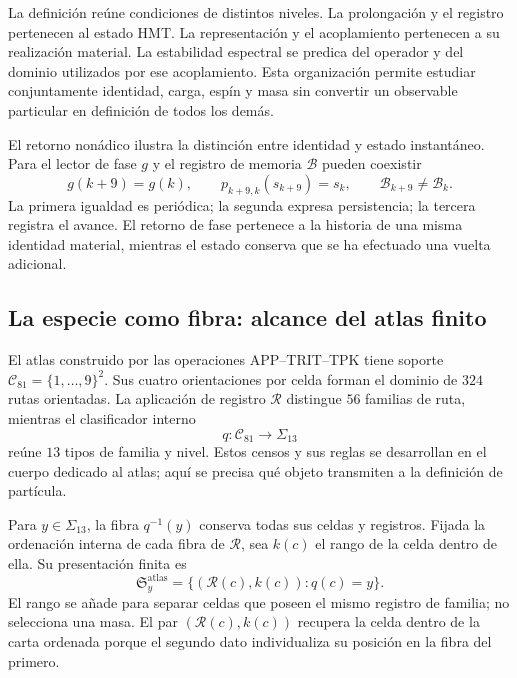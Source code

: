 La definición reúne condiciones de distintos niveles. La prolongación
y el registro pertenecen al estado HMT. La representación y el
acoplamiento pertenecen a su realización material. La estabilidad
espectral se predica del operador y del dominio utilizados por ese
acoplamiento. Esta organización permite estudiar conjuntamente identidad,
carga, espín y masa sin convertir un observable particular en definición
de todos los demás.

El retorno nonádico ilustra la distinción entre identidad y estado
instantáneo. Para el lector de fase $g$ y el registro de memoria
$\mathcal B$ pueden coexistir
\begin{equation}
 g(k+9)=g(k),\qquad
 p_{k+9,k}(s_{k+9})=s_k,\qquad
 \mathcal B_{k+9}\ne\mathcal B_k.
 \label{vi:vi:eq:persistencia-fase-memoria}
\end{equation}
La primera igualdad es periódica; la segunda expresa persistencia; la
tercera registra el avance. El retorno de fase pertenece a la historia
de una misma identidad material, mientras el estado conserva que se ha
efectuado una vuelta adicional.

\subsection{La especie como fibra: alcance del atlas finito}
\label{vi:vi:subsec:especie-fibra}

El atlas construido por las operaciones APP--TRIT--TPK tiene soporte
$\mathcal C_{81}=\{1,\ldots,9\}^2$. Sus cuatro orientaciones por
celda forman el dominio de $324$ rutas orientadas. La aplicación de
registro $\mathcal R$ distingue $56$ familias de ruta, mientras el
clasificador interno
\begin{equation}
 q:\mathcal C_{81}\longrightarrow\Sigma_{13}
 \label{vi:vi:eq:clasificador-especies}
\end{equation}
reúne $13$ tipos de familia y nivel. Estos censos y sus reglas se
desarrollan en el cuerpo dedicado al atlas; aquí se precisa qué objeto
transmiten a la definición de partícula.

Para $y\in\Sigma_{13}$, la fibra $q^{-1}(y)$ conserva todas sus
celdas y registros. Fijada la ordenación interna de cada fibra de
$\mathcal R$, sea $k(c)$ el rango de la celda dentro de ella. Su
presentación finita es
\begin{equation}
 \mathfrak S_y^{\mathrm{atlas}}
 =\{(\mathcal R(c),k(c)):q(c)=y\}.
 \label{vi:vi:eq:multiseccion-atlas}
\end{equation}
El rango se añade para separar celdas que poseen el mismo registro de
familia; no selecciona una masa. El par $(\mathcal R(c),k(c))$
recupera la celda dentro de la carta ordenada porque el segundo dato
individualiza su posición en la fibra del primero.

